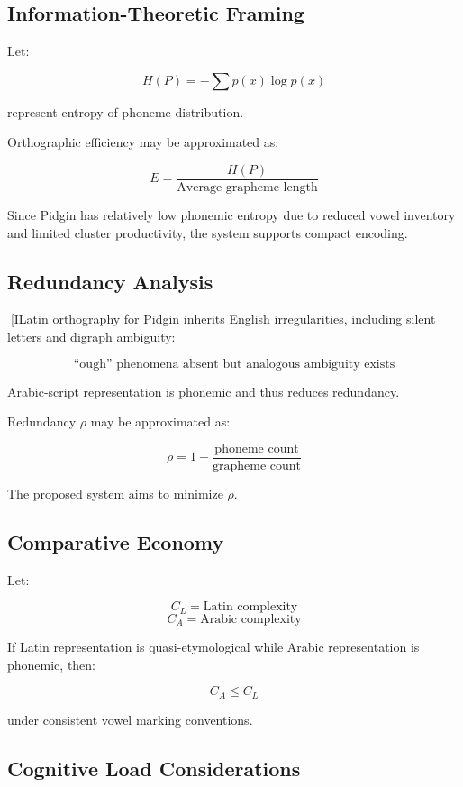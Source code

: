 \documentclass[12pt]{article}
\begin{document}
\subsection{Information-Theoretic Framing}

Let:

\[
H(P) = -\sum p(x)\log p(x)
\]

represent entropy of phoneme distribution.

Orthographic efficiency may be approximated as:

\[
E = \frac{H(P)}{\text{Average grapheme length}}
\]

Since Pidgin has relatively low phonemic entropy due to reduced vowel inventory and limited cluster productivity, the system supports compact encoding.

\subsection{Redundancy Analysis}

[ILatin orthography for Pidgin inherits English irregularities, including silent letters and digraph ambiguity:

\[
\text{“ough” phenomena absent but analogous ambiguity exists}
\]

Arabic-script representation is phonemic and thus reduces redundancy.

Redundancy \( \rho \) may be approximated as:

\[
\rho = 1 - \frac{\text{phoneme count}}{\text{grapheme count}}
\]

The proposed system aims to minimize \( \rho \).

\subsection{Comparative Economy}

Let:

\[
C_L = \text{Latin complexity}
\]
\[
C_A = \text{Arabic complexity}
\]

If Latin representation is quasi-etymological while Arabic representation is phonemic, then:

\[
C_A \leq C_L
\]

under consistent vowel marking conventions.

\subsection{Cognitive Load Considerations}
\end{document}
